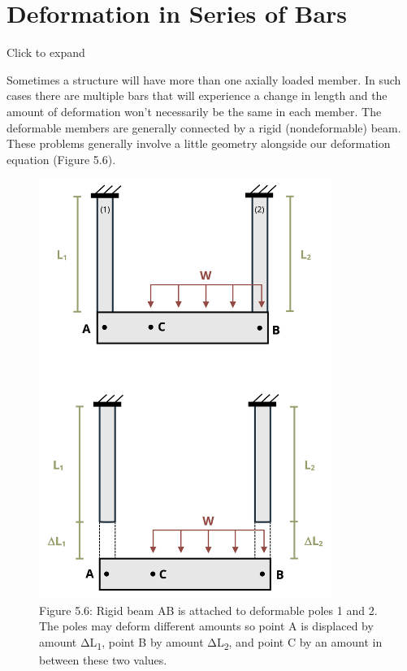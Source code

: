 \documentclass[
  letterpaper,
  DIV=11,
  numbers=noendperiod]{scrreprt}
\begin{document}
\section{Deformation in Series of Bars}\label{sec-5.4}

Click to expand

Sometimes a structure will have more than one axially loaded member. In
such cases there are multiple bars that will experience a change in
length and the amount of deformation won't necessarily be the same in
each member. The deformable members are generally connected by a rigid
(nondeformable) beam. These problems generally involve a little geometry
alongside our deformation equation (Figure 5.6).

\begin{figure}[H]

{\centering \includegraphics[width=3.75in,height=\textheight]{images/PNGs/Figure 5.7.png}

}

\caption{Figure 5.6: Rigid beam AB is attached to deformable poles 1 and
2. The poles may deform different amounts so point A is displaced by
amount ΔL\textsubscript{1}, point B by amount ΔL\textsubscript{2}, and
point C by an amount in between these two values.}

\end{figure}%
\end{document}
